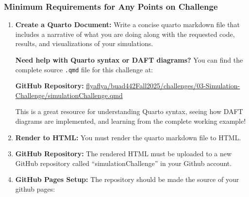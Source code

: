 \documentclass[
  letterpaper,
  DIV=11,
  numbers=noendperiod]{scrartcl}
\theoremstyle{definition}
\theoremstyle{remark}
\begin{document}
\subsubsection{Minimum Requirements for Any Points on
Challenge}\label{minimum-requirements-for-any-points-on-challenge}

\begin{enumerate}
\def\labelenumi{\arabic{enumi}.}
\item
  \textbf{Create a Quarto Document:} Write a concise quarto markdown
  file that includes a narrative of what you are doing along with the
  requested code, results, and visualizations of your simulations.

  \begin{tcolorbox}[enhanced jigsaw, titlerule=0mm, colbacktitle=quarto-callout-tip-color!10!white, coltitle=black, leftrule=.75mm, colback=white, colframe=quarto-callout-tip-color-frame, breakable, rightrule=.15mm, toprule=.15mm, title=\textcolor{quarto-callout-tip-color}{\faLightbulb}\hspace{0.5em}{💡 Pro Tip: Source File Reference}, bottomrule=.15mm, opacityback=0, bottomtitle=1mm, left=2mm, toptitle=1mm, arc=.35mm, opacitybacktitle=0.6]

  \textbf{Need help with Quarto syntax or DAFT diagrams?} You can find
  the complete source \texttt{.qmd} file for this challenge at:

  \textbf{GitHub Repository:}
  \href{https://github.com/flyaflya/buad442Fall2025/blob/main/challenges/03-Simulation-Challenge/simulationChallenge.qmd}{flyaflya/buad442Fall2025/challenges/03-Simulation-Challenge/simulationChallenge.qmd}

  This is a great resource for understanding Quarto syntax, seeing how
  DAFT diagrams are implemented, and learning from the complete working
  example!

  \end{tcolorbox}
\item
  \textbf{Render to HTML:} You must render the quarto markdown file to
  HTML.
\item
  \textbf{GitHub Repository:} The rendered HTML must be uploaded to a
  new GitHub repository called ``simulationChallenge'' in your Github
  account.
\item
  \textbf{GitHub Pages Setup:} The repository should be made the source
  of your github pages:


\end{enumerate}
\end{document}
